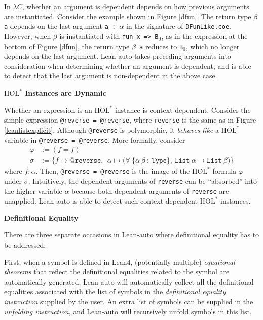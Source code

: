   In $\lambda C$, whether an argument is dependent depends on how previous arguments
are instantiated. Consider the example shown in Figure \ref{dfun}. The return
type \texttt{$\beta$ a} depends on the last argument \texttt{a : $\alpha$} in the signature of
\texttt{DFunLike.coe}. However, when $\beta$ is instantiated with \texttt{fun x => B$_0$}, as in the
expression at the bottom of Figure \ref{dfun}, the return type \texttt{$\beta$ a} reduces to \texttt{B$_0$},
which no longer depends on the last argument. Lean-auto takes preceding arguments into
consideration when determining whether an argument is dependent, and is able to detect
that the last argument is non-dependent in the above case.

\noindent \textbf{$\text{HOL}^*$ Instances are Dynamic}

  Whether an expression is an $\text{HOL}^*$ instance is context-dependent.
Consider the simple expression \texttt{@reverse = @reverse}, where \texttt{reverse}
is the same as in Figure \ref{leanlistexplicit}. Although \texttt{@reverse} is polymorphic,
it \textit{behaves like} a $\text{HOL}^*$ variable in \texttt{@reverse = @reverse}. More formally,
consider
$$\begin{aligned}
\varphi &:= (f = f) \\
\sigma  &:= \{f \mapsto \texttt{@reverse}, \ \ \alpha \mapsto \texttt{(} \forall \ \texttt{\{}\alpha \ \beta \ : \ \texttt{Type\}}, \ 
  \texttt{List} \ \alpha \to \texttt{List} \ \beta \texttt{)}\}
\end{aligned}$$
where $f : \alpha$. Then, \texttt{@reverse = @reverse} is the image of the $\text{HOL}^*$ formula $\varphi$
under $\sigma$. Intuitively, the dependent arguments of \texttt{reverse} can be ``absorbed''
into the higher variable $\alpha$ because both dependent arguments of \texttt{reverse} are unapplied.
Lean-auto is able to detect such context-dependent $\text{HOL}^*$ instances.

\noindent \textbf{Definitional Equality}

  There are three separate occasions in Lean-auto where definitional
equality has to be addressed.

  First, when a symbol is defined in Lean4, (potentially multiple) \textit{equational theorems} that
reflect the definitional equalities related to the symbol are automatically generated.
Lean-auto will automatically collect all the definitional equalities associated with the
list of symbols in the \textit{definitional equality instruction} supplied by the user. An
extra list of symbols can be supplied in the \textit{unfolding instruction}, and Lean-auto will
recursively unfold symbols in this list.

